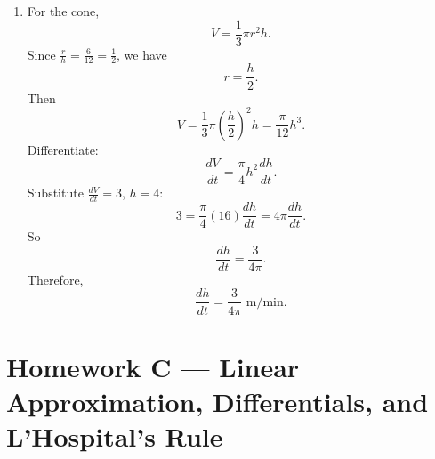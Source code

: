 \documentclass[11pt]{article}
\begin{document}
\begin{enumerate}
    \item 
    For the cone,
    \[
    V=\frac13\pi r^2h.
    \]
    Since \(\frac{r}{h}=\frac{6}{12}=\frac12\), we have
    \[
    r=\frac h2.
    \]
    Then
    \[
    V=\frac13\pi\left(\frac h2\right)^2h=\frac{\pi}{12}h^3.
    \]
    Differentiate:
    \[
    \frac{dV}{dt}=\frac{\pi}{4}h^2\frac{dh}{dt}.
    \]
    Substitute \(\frac{dV}{dt}=3\), \(h=4\):
    \[
    3=\frac{\pi}{4}(16)\frac{dh}{dt}=4\pi\frac{dh}{dt}.
    \]
    So
    \[
    \frac{dh}{dt}=\frac{3}{4\pi}.
    \]
    Therefore,
    \[
    \boxed{\frac{dh}{dt}=\frac{3}{4\pi}\text{ m/min}.}
    \]
\end{enumerate}

\bigskip

\section*{Homework C --- Linear Approximation, Differentials, and L'Hospital's Rule}
\end{document}
